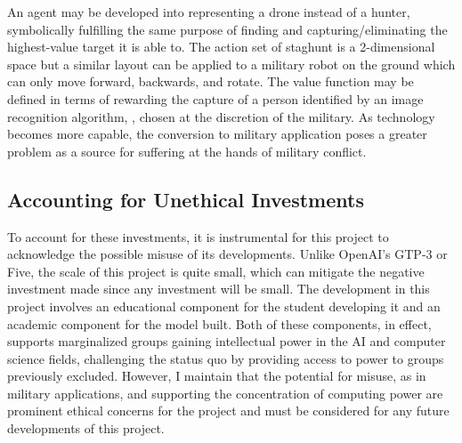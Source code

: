 \documentclass[10pt,twocolumn]{article}
\begin{document}
An agent may be developed into representing a drone instead of a hunter, symbolically fulfilling the same purpose of finding and capturing/eliminating the highest-value target it is able to. The action set of staghunt is a 2-dimensional space but a similar layout can be applied to a military robot on the ground which can only move forward, backwards, and rotate. The value function may be defined in terms of rewarding the capture of a person identified by an image recognition algorithm, , chosen at the discretion of the military. As technology becomes more capable, the conversion to military application poses a greater problem as a source for suffering at the hands of military conflict.

\subsection{Accounting for Unethical Investments}
	
To account for these investments, it is instrumental for this project to acknowledge the possible misuse of its developments. Unlike OpenAI’s GTP-3 or Five, the scale of this project is quite small, which can mitigate the negative investment made since any investment will be small. The development in this project involves an educational component for the student developing it and an academic component for the model built. Both of these components, in effect, supports marginalized groups gaining intellectual power in the AI and computer science fields, challenging the status quo by providing access to power to groups previously excluded. However, I maintain that the potential for misuse, as in military applications, and supporting the concentration of computing power are prominent ethical concerns for the project and must be considered for any future developments of this project.

\printbibliography 
\end{document}
